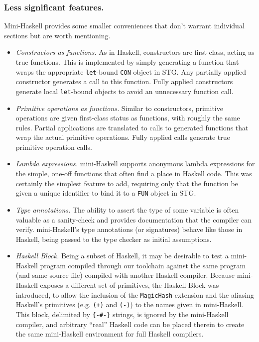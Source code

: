 \documentclass{llncs}
\begin{document}
\subsubsection{Less significant features.}

Mini-Haskell provides some smaller conveniences that don't warrant individual
sections but are worth mentioning.
\begin{itemize}
\item \emph{Constructors as functions.}
  As in Haskell, constructors are first class, acting as true functions.  This
  is implemented by simply generating a function that wraps the appropriate
  \texttt{let}-bound \texttt{CON} object in STG.  Any partially applied
  constructor generates a call to this function.  Fully applied constructors
  generate local \texttt{let}-bound objects to avoid an unnecessary function
  call.

\item \emph{Primitive operations as functions.}
  Similar to constructors, primitive operations are given first-class status as
  functions, with roughly the same rules.  Partial applications are
  translated to calls to generated functions that wrap the actual primitive
  operations. Fully applied calls generate true primitive operation calls.

\item \emph{Lambda expressions.}
  mini-Haskell supports anonymous lambda expressions for the simple, one-off
  functions that often find a place in Haskell code.  This was certainly the
  simplest feature to add, requiring only that the function be given a unique
  identifier to bind it to a \texttt{FUN} object in STG.

\item \emph{Type annotations.}
  The ability to assert the type of some variable is often valuable as a
  sanity-check and provides documentation that the compiler can verify.
  mini-Haskell's type annotations (or signatures) behave like those in
  Haskell, being passed to the type checker as initial assumptions.

\item \emph{Haskell Block.}
  Being a subset of Haskell, it may be desirable to test a mini-Haskell program
  compiled through our toolchain against the same program (and same source file)
  compiled with another Haskell compiler.  Because mini-Haskell exposes a
  different set of primitives, the Haskell Block was introduced, to allow the
  inclusion of the \texttt{MagicHash} extension and the aliasing Haskell's
  primitives (e.g. \texttt{(+)} and \texttt{(-)}) to the names given in
  mini-Haskell.  This block, delimited by \texttt{\{-\#-\}} strings, is ignored
  by the mini-Haskell compiler, and arbitrary ``real'' Haskell code can be
  placed therein to create the same mini-Haskell environment for full Haskell
  compilers.

\end{itemize}
\end{document}
